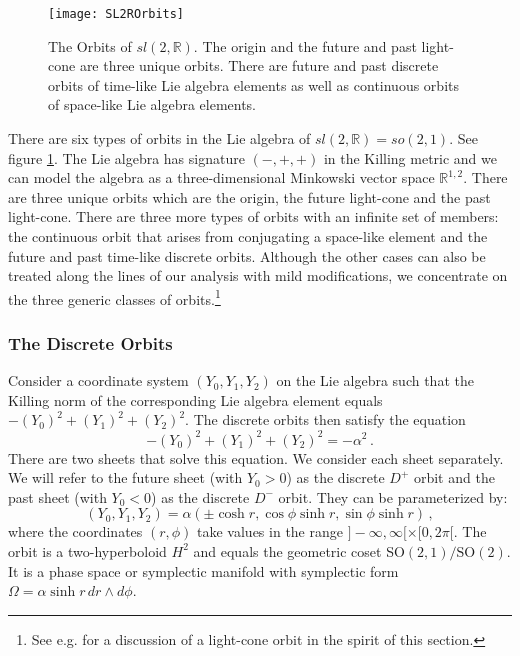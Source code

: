 \documentclass[12pt]{article}
\numberwithin{equation}{section}
\numberwithin{equation}{section}
\numberwithin{table}{section}\setlength{\multlinegap}{25pt}
\begin{document}
\begin{figure}
\begin{center}
\texttt{[image: SL2ROrbits]}
\end{center}
\caption{The Orbits of $sl(2,\mathbb{R})$. The origin and the future and past light-cone are three unique orbits. There are future and past discrete orbits of time-like Lie algebra elements as well as continuous orbits of space-like Lie algebra elements. }
\label{SL2ROrbits}
\end{figure}
There are six types of orbits in the Lie algebra of  $sl(2,\mathbb{R})=so(2,1)$. See figure \ref{SL2ROrbits}. The Lie algebra has signature $(-,+,+)$ in the Killing metric and we can model the algebra as a three-dimensional  Minkowski vector space $\mathbb{R}^{1,2}$. There are three unique orbits which are the origin, the future light-cone and  the past light-cone. There are three more types of orbits with an infinite set of members: the continuous orbit that arises from conjugating a space-like element and the future and past time-like discrete orbits. Although the other cases can also be treated along the lines of our analysis with mild modifications, we concentrate on the three generic classes of orbits.\footnote{See e.g. \cite{Troost:2012ck} for a discussion of a light-cone orbit in the spirit of this section.} 



\subsubsection{The Discrete Orbits}
Consider a coordinate system $(Y_0,Y_1,Y_2)$ on the Lie algebra such that the Killing norm of the corresponding Lie algebra element equals $-(Y_0)^2 + (Y_1)^2 + (Y_2)^2$.
The discrete orbits then satisfy the equation
\begin{equation}
-(Y_0)^2 + (Y_1)^2 + (Y_2)^2 = -\alpha^2 \, .
\end{equation}
There are two sheets that solve this equation. We consider each sheet separately. We will refer to the future sheet (with $Y_0>0$) as the discrete $D^+$ orbit  and the past sheet (with $Y_0<0$) as the discrete $D^-$ orbit. 
They can be parameterized by:
\begin{equation}
(Y_0,Y_1,Y_2) = \alpha (\pm \cosh r, \cos \phi \sinh r, \sin \phi \sinh r)
\, ,
\label{DiscreteOrbitRAndPhi}
\end{equation}
where the coordinates $(r,\phi)$ take values in the range $]-\infty,\infty[ \times [0,2 \pi[$. 
The orbit is a two-hyperboloid $H^2$ and equals the geometric coset SO$(2,1)/\mathrm{SO}(2)$. It is a phase space or symplectic manifold with  symplectic form $\Omega= \alpha \sinh r \, dr \wedge d \phi$.
\end{document}
